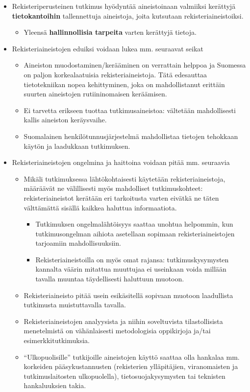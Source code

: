 \documentclass[
]{book}
\providecommand{\tightlist}{%
  \setlength{\itemsep}{0pt}\setlength{\parskip}{0pt}}
\begin{document}
\begin{itemize}
\item
  Rekisteriperusteinen tutkimus hyödyntää aineistoinaan valmiiksi kerättyjä \textbf{tietokantoihin} tallennettuja aineistoja, joita kutsutaan rekisteriaineistoiksi.

  \begin{itemize}
  \tightlist
  \item
    Yleensä \textbf{hallinnollisia tarpeita} varten kerättyjä tietoja.
  \end{itemize}
\item
  Rekisteriaineistojen eduiksi voidaan lukea mm. seuraavat seikat

  \begin{itemize}
  \tightlist
  \item
    Aineiston muodostaminen/kerääminen on verrattain helppoa ja Suomessa on paljon korkealaatuisia rekisteriaineistoja. Tätä edesauttaa tietotekniikan nopea kehittyminen, joka on mahdollistanut erittäin suurten aineistojen rutiininomaisen keräämisen.
  \item
    Ei tarvetta erikseen tuottaa tutkimusaineistoa: vältetään mahdollisesti kallis aineiston keräysvaihe.
  \item
    Suomalainen henkilötunnusjärjestelmä mahdollistaa tietojen tehokkaan käytön ja laadukkaan tutkimuksen.
  \end{itemize}
\item
  Rekisteriaineistojen ongelmina ja haittoina voidaan pitää mm. seuraavia

  \begin{itemize}
  \tightlist
  \item
    Mikäli tutkimuksessa lähtökohtaisesti käytetään rekisteriaineistoja, määräävät ne välillisesti myös mahdolliset tutkimuskohteet: rekisteriaineistot kerätään eri tarkoitusta varten eivätkä ne täten välttämättä sisällä kaikkea haluttua informaatiota.

    \begin{itemize}
    \tightlist
    \item
      Tutkimuksen ongelmalähtöisyys saattaa unohtua helpommin, kun tutkimusongelman aihiota asetellaan sopimaan rekisteriaineistojen tarjoamiin mahdollisuuksiin.
    \item
      Rekisteriaineistoilla on myös omat rajansa: tutkimuskysymysten kannalta väärin mitattua muuttujaa ei useinkaan voida millään tavalla muuntaa täydellisesti haluttuun muotoon.
    \end{itemize}
  \item
    Rekisteriaineisto pitää usein esikäsitellä sopivaan muotoon laadullista tutkimusta muistuttavalla tavalla.
  \item
    Rekisteriaineistojen analyysista ja niihin soveltuvista tilastollisista menetelmistä on vähänlaisesti metodologisia oppikirjoja ja/tai esimerkkitutkimuksia.
  \item
    ``Ulkopuolisille'' tutkijoille aineistojen käyttö saattaa olla hankalaa mm. korkeiden pääsykustannusten (rekisterien ylläpitäjien, viranomaisten ja tutkimuslaitosten ulkopuolella), tietosuojakysymysten tai teknisten hankaluuksien takia.


\end{itemize}
\end{itemize}
\end{document}
